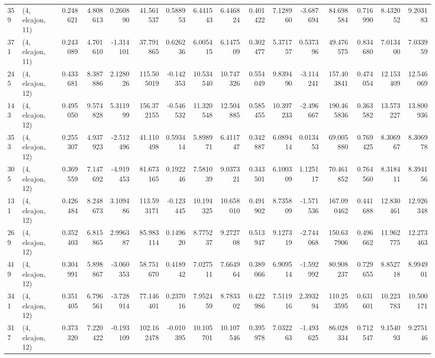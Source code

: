 \begin{tabular}{llrrrrrrrrrrrrrr}
359 &  (4, elcajon, 11) &   0.248621 &   4.808613 &   0.260890 &    41.561537 &   0.588953 &   6.441543 &   6.446824 &  0.401422 &   7.128960 &  -3.687694 &    84.698584 &   0.716990 &   8.432052 &   9.203183 \\
371 &  (4, elcajon, 11) &   0.243089 &   4.701610 &  -1.314101 &    37.791865 &   0.626236 &   6.005415 &   6.147509 &  0.302477 &   5.371757 &   0.537396 &    49.476575 &   0.834680 &   7.013400 &   7.033959 \\
245 &  (4, elcajon, 12) &   0.433681 &   8.387886 &   2.128026 &   115.505019 &  -0.142353 &  10.534540 &  10.747326 &  0.554049 &   9.839490 &  -3.114241 &   157.403841 &   0.474054 &  12.153409 &  12.546069 \\
143 &  (4, elcajon, 12) &   0.495050 &   9.574828 &   5.311999 &   156.372155 &  -0.546532 &  11.320548 &  12.504885 &  0.585455 &  10.397233 &  -2.496667 &   190.465836 &   0.363582 &  13.573227 &  13.800936 \\
353 &  (4, elcajon, 12) &   0.255307 &   4.937923 &  -2.512496 &    41.110498 &   0.593414 &   5.898971 &   6.411747 &  0.342887 &   6.089414 &   0.013453 &    69.005880 &   0.769425 &   8.306967 &   8.306978 \\
305 &  (4, elcajon, 12) &   0.369559 &   7.147692 &  -4.919453 &    81.673165 &   0.192246 &   7.581039 &   9.037321 &  0.343501 &   6.100309 &   1.125117 &    70.461852 &   0.764560 &   8.318411 &   8.394156 \\
131 &  (4, elcajon, 12) &   0.426484 &   8.248673 &   3.109486 &   113.593171 &  -0.123445 &  10.194325 &  10.658010 &  0.491902 &   8.735809 &  -1.571536 &   167.090462 &   0.441688 &  12.830461 &  12.926348 \\
269 &  (4, elcajon, 12) &   0.352403 &   6.815865 &   2.996387 &    85.983114 &   0.149620 &   8.775237 &   9.272708 &  0.513947 &   9.127319 &  -2.744068 &   150.637906 &   0.496662 &  11.962775 &  12.273463 \\
419 &  (4, elcajon, 12) &   0.304991 &   5.898867 &  -3.060353 &    58.751670 &   0.418942 &   7.027511 &   7.664964 &  0.389066 &   6.909514 &  -1.592992 &    80.908237 &   0.729655 &   8.852718 &   8.994901 \\
341 &  (4, elcajon, 12) &   0.351405 &   6.796561 &  -3.728914 &    77.146401 &   0.237016 &   7.952459 &   8.783302 &  0.422986 &   7.511916 &   2.393294 &   110.253595 &   0.631601 &  10.223783 &  10.500171 \\
317 &  (4, elcajon, 12) &   0.373320 &   7.220422 &  -0.193109 &   102.162478 &  -0.010395 &  10.105701 &  10.107546 &  0.395978 &   7.032263 &  -1.493625 &    86.028334 &   0.712547 &   9.154093 &   9.275146 \\

\end{tabular}
